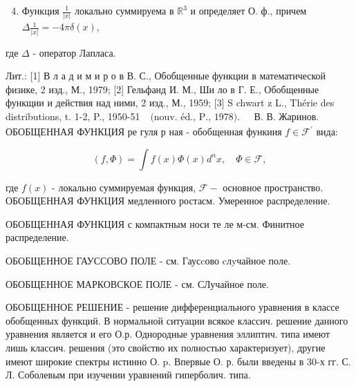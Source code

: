 \documentclass[10pt]{article}
\begin{document}
\begin{enumerate}

  \setcounter{enumi}{3}

  \item Функция $\frac{1}{|x|}$ локально суммируема в $\mathbb{R}^{3}$ и определяет О. ф., причем $\Delta \frac{1}{|x|}=-4 \pi \delta(x)$,

\end{enumerate}



где $\Delta$ - оператор Лапласа.



Лит.: [1] В л а д и м и р о в В. С., Обобщенные функции в математической физике, 2 изд., М., 1979; [2] Гельфанд И. М., Ши ло в Г. Е., Обобщенные функщии и действия над ними, 2 изд., М., 1959; [3] S chwart z L., Thérie des distributions, t. 1-2, P., 1950-51 $\begin{array}{ll}\text { (nouv. éd., P., 1978). } & \text { В. В. Жаринов. }\end{array}$ ОБОБЩЕННАЯ ФУНКЦИЯ ре гуля р ная - обобщенная функиия $f \in \mathscr{F}^{\prime}$ вида:



\[

(f, \Phi)=\int f(x) \Phi(x) d^{n} x, \quad \Phi \in \mathscr{F},

\]



где $f(x)$ - локально суммируемая функция, $\mathscr{F}-$ основное пространство. ОБОБЩЕННАЯ ФУНКЦИЯ медленного ростасм. Умеренное распределение.



ОБОБЩЕННАЯ ФУНКЦИЯ с компактным носи те ле м-см. Финитное распределение.



ОБОБЩЕННОЕ ГАУССОВО ПОЛЕ - см. Гаусcово cлyчайное поле.



ОБОБЩЕННОЕ МАРКОВСКОЕ ПОЛЕ - см. СЛучайное поле.



ОБОБЩЕННОЕ РЕШЕНИЕ - решение дифференциального уравнения в классе обобщенных функций. В нормальной ситуации всякое классич. решение данного уравнения является и его О.р. Однородные уравнения эллиптич. типа имеют лишь классич. решения (это свойство их полностью характеризует), другие имеют широкие спектры истинно О. p. Впервые О. р. были введены в 30-х гг. С. Л. Соболевым при изучении уравнений гиперболич. типа.
\end{document}
